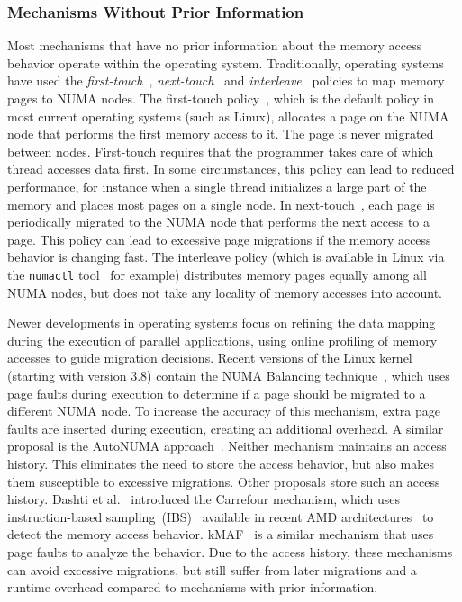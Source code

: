 \subsubsection{Mechanisms Without Prior Information}
Most mechanisms that have no prior information about the memory access behavior operate within the operating system.
Traditionally, operating systems have used the \emph{first-touch}~\cite{Marchetti1995}, \emph{next-touch}~\cite{Lof2005} and \emph{interleave}~\cite{Kleen2004} policies to map memory pages to NUMA nodes.
The first-touch policy~\cite{Marchetti1995}, which is the default policy in most current operating systems (such as Linux), allocates a page on the NUMA node that performs the first memory access to it.
The page is never migrated between nodes.
First-touch requires that the programmer takes care of which thread accesses data first.
In some circumstances, this policy can lead to reduced performance, for
instance when a single thread initializes a large part of the memory and places most pages on a single node.
In next-touch~\cite{Lof2005}, each page is periodically migrated to the NUMA node that performs the next access to a page.
This policy can lead to excessive page migrations if the memory access behavior is changing fast.
The interleave policy (which is available in Linux via the \texttt{numactl} tool~\cite{Kleen2004} for example) distributes memory pages equally among all NUMA nodes, but does not take any locality of memory accesses into account.

Newer developments in operating systems focus on refining the data mapping during the execution of parallel applications, using online profiling of memory accesses to guide migration decisions.
Recent versions of the Linux kernel (starting with version 3.8) contain the NUMA Balancing technique~\cite{Corbet}, which uses page faults during execution to determine if a page should be migrated to a different NUMA node. To increase the accuracy of this mechanism, extra page faults are inserted during execution, creating an additional overhead.
A similar proposal is the AutoNUMA approach~\cite{Corbet2012}.
Neither mechanism maintains an access history. This eliminates the need to store the access behavior, but also makes them susceptible to excessive migrations.
Other proposals store such an access history.
Dashti et al.~\cite{Dashti2013} introduced the Carrefour mechanism, which uses instruction-based sampling~(IBS)~\cite{Drongowski07Instructionbased} available in recent AMD architectures~\cite{AMD2012} to detect the memory access behavior.
kMAF~\cite{Diener2014} is a similar mechanism that uses page faults to analyze the behavior.
Due to the access history, these mechanisms can avoid excessive migrations, but still suffer from later migrations and a runtime overhead compared to mechanisms with prior information.

